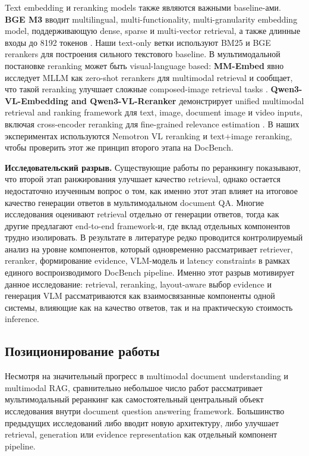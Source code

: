 \documentclass[conference]{IEEEtran}
\begin{document}
Text embedding и reranking models также являются важными baseline-ами. \textbf{BGE M3} вводит multilingual, multi-functionality, multi-granularity embedding model, поддерживающую dense, sparse и multi-vector retrieval, а также длинные входы до 8192 токенов \cite{m3embedding2024}. Наши text-only ветки используют BM25 и BGE rerankers для построения сильного текстового baseline. В мультимодальной постановке reranking может быть visual-language based: \textbf{MM-Embed} явно исследует MLLM как zero-shot rerankers для multimodal retrieval и сообщает, что такой reranking улучшает сложные composed-image retrieval tasks \cite{mmembed2024}. \textbf{Qwen3-VL-Embedding and Qwen3-VL-Reranker} демонстрирует unified multimodal retrieval and ranking framework для text, image, document image и video inputs, включая cross-encoder reranking для fine-grained relevance estimation \cite{qwen3vlreranker2026}. В наших экспериментах используются Nemotron VL reranking и text+image reranking, чтобы проверить этот же принцип второго этапа на DocBench.

\textbf{Исследовательский разрыв.} Существующие работы по реранкингу показывают, что второй этап ранжирования улучшает качество retrieval, однако остается недостаточно изученным вопрос о том, как именно этот этап влияет на итоговое качество генерации ответов в мультимодальном document QA. Многие исследования оценивают retrieval отдельно от генерации ответов, тогда как другие предлагают end-to-end framework-и, где вклад отдельных компонентов трудно изолировать. В результате в литературе редко проводится контролируемый анализ на уровне компонентов, который одновременно рассматривает retriever, reranker, формирование evidence, VLM-модель и latency constraints в рамках единого воспроизводимого DocBench pipeline. Именно этот разрыв мотивирует данное исследование: retrieval, reranking, layout-aware выбор evidence и генерация VLM рассматриваются как взаимосвязанные компоненты одной системы, влияющие как на качество ответов, так и на практическую стоимость inference.

\subsection{Позиционирование работы}

Несмотря на значительный прогресс в multimodal document understanding и multimodal RAG, сравнительно небольшое число работ рассматривает мультимодальный реранкинг как самостоятельный центральный объект исследования внутри document question answering framework. Большинство предыдущих исследований либо вводит новую архитектуру, либо улучшает retrieval, generation или evidence representation как отдельный компонент pipeline.
\end{document}

